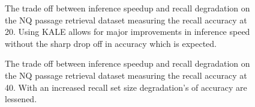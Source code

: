\begin{figure}[!htb]
    \centering
    \caption{The trade off between inference speedup and recall degradation on the NQ passage retrieval dataset measuring the recall accuracy at 20. Using KALE allows for major improvements in inference speed without the sharp drop off in accuracy which is expected.  }
    \label{fig:KALE-NQ-Top20}
\end{figure}
\begin{figure}[!htb]
    \centering
    \caption{The trade off between inference speedup and recall degradation on the NQ passage retrieval dataset measuring the recall accuracy at 40. With an increased recall set size degradation's of accuracy are lessened.}
    \label{fig:KALE-NQ-Top40}
\end{figure}
